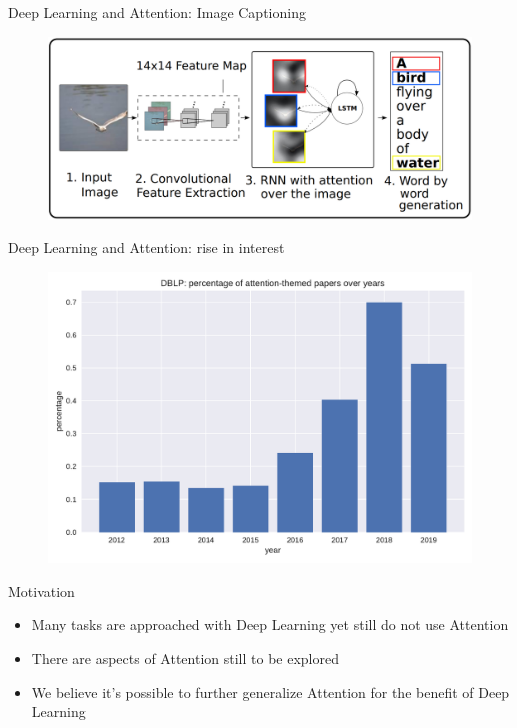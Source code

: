 \documentclass[10pt]{beamer}
\begin{document}
\begin{frame}{Deep Learning and Attention: Image Captioning}
    \begin{figure}
        \centering
        \includegraphics[width=1.0\linewidth]{./img/img_captioning.png}
    \end{figure}
\end{frame}

\begin{frame}{Deep Learning and Attention: rise in interest}
    \begin{figure}
        \centering
        \includegraphics[width=0.9\linewidth]{./img/dblp_att_papers.pdf}
    \end{figure}
\end{frame}

\begin{frame}{Motivation}
    \begin{itemize}
        \item Many tasks are approached with Deep Learning yet still do not use Attention
        \item There are aspects of Attention still to be explored
        \item We believe it's possible to further generalize Attention for the benefit of Deep Learning
    \end{itemize}
\end{frame}
\end{document}
